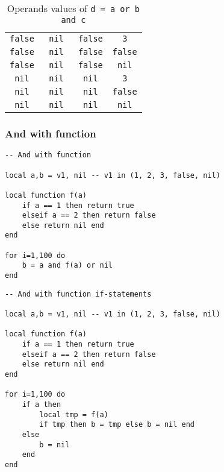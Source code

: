 \begin{table}[H]
\begin{tabular}{|c|c|c|c|}
		\texttt{false} & \texttt{ nil } & \texttt{false} & \texttt{  3  } \\
		\texttt{false} & \texttt{ nil } & \texttt{false} & \texttt{false} \\
		\texttt{false} & \texttt{ nil } & \texttt{false} & \texttt{ nil } \\
		\texttt{ nil } & \texttt{ nil } & \texttt{ nil } & \texttt{  3  } \\
		\texttt{ nil } & \texttt{ nil } & \texttt{ nil } & \texttt{false} \\
		\texttt{ nil } & \texttt{ nil } & \texttt{ nil } & \texttt{ nil } \\
        \hline
    \end{tabular}
    \caption{Operands values of \texttt{d = a or b and c}}
    \label{tab:or-and-transformation}
\end{table}





\subsubsection{And with function}

\begin{mdframed}[style=LuaStyleFrame]
\begin{lstlisting}[style=LuaStyle]
-- And with function

local a,b = v1, nil -- v1 in (1, 2, 3, false, nil)

local function f(a)
	if a == 1 then return true
	elseif a == 2 then return false
	else return nil end
end

for i=1,100 do
	b = a and f(a) or nil
end
\end{lstlisting}
\end{mdframed}

\begin{mdframed}[style=LuaStyleFrame]
\begin{lstlisting}[style=LuaStyle]
-- And with function if-statements

local a,b = v1, nil -- v1 in (1, 2, 3, false, nil)

local function f(a)
	if a == 1 then return true
	elseif a == 2 then return false
	else return nil end
end

for i=1,100 do
	if a then
		local tmp = f(a)
		if tmp then b = tmp else b = nil end
	else
		b = nil
	end
end
\end{lstlisting}
\end{mdframed}

